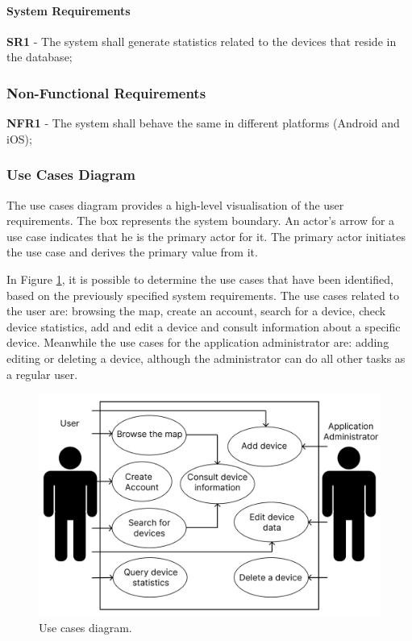 \paragraph{System Requirements}

\textbf{SR1} - The system shall generate statistics related to the \hyperlink{\acronym}{\acronym} devices that reside in the database;

\subsubsection{Non-Functional Requirements}

\textbf{NFR1} - The system shall behave the same in different platforms (Android and iOS);

\subsubsection{Use Cases Diagram}

The use cases diagram \cite{wiegers2013software} provides a high-level visualisation of the user
requirements. The box represents the system boundary. An actor's arrow
for a use case indicates that he is the primary actor for it.
The primary actor initiates the use case and derives the primary value
from it.

In Figure \ref{fig:use_cases_diagram}, it is possible to determine the use cases
that have been identified, based on the previously specified system requirements.
The use cases related to the user are: browsing the map, create an account, search for
a device, check device statistics, add and edit a device and consult information
about a specific device. Meanwhile the use cases for the application administrator are:
adding editing or deleting a device, although the administrator can do all other
tasks as a regular user.

\begin{figure}[H]
    \centering
    \includegraphics[width=15cm]{../app/docs/software_requirements/assets/images/use_cases_diagram.png}
    \caption{Use cases diagram.}
    \label{fig:use_cases_diagram}
\end{figure}

